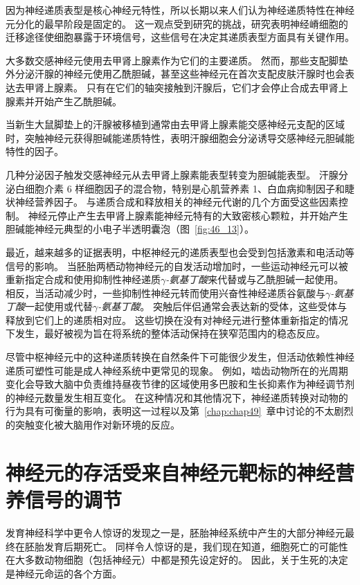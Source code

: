 因为神经递质表型是核心神经元特性，所以长期以来人们认为神经递质特性在神经元分化的最早阶段是固定的。
这一观点受到研究的挑战，研究表明神经嵴细胞的迁移途径使细胞暴露于环境信号，这些信号在决定其递质表型方面具有关键作用。


大多数交感神经元使用去甲肾上腺素作为它们的主要递质。
然而，那些支配脚垫外分泌汗腺的神经元使用乙酰胆碱，甚至这些神经元在首次支配皮肤汗腺时也会表达去甲肾上腺素。
只有在它们的轴突接触到汗腺后，它们才会停止合成去甲肾上腺素并开始产生乙酰胆碱。


当新生大鼠脚垫上的汗腺被移植到通常由去甲肾上腺素能交感神经元支配的区域时，突触神经元获得胆碱能递质特性，表明汗腺细胞会分泌诱导交感神经元胆碱能特性的因子。


几种分泌因子触发交感神经元从去甲肾上腺素能表型转变为胆碱能表型。
汗腺分泌白细胞介素 6 样细胞因子的混合物，特别是心肌营养素 1、白血病抑制因子和睫状神经营养因子。
与递质合成和释放相关的神经元代谢的几个方面受这些因素控制。
神经元停止产生去甲肾上腺素能神经元特有的大致密核心颗粒，并开始产生胆碱能神经元典型的小电子半透明囊泡（图~\ref{fig:46_13}）。


最近，越来越多的证据表明，中枢神经元的递质表型也会受到包括激素和电活动等信号的影响。
当胚胎两栖动物神经元的自发活动增加时，一些运动神经元可以被重新指定合成和使用抑制性神经递质\textit{$\gamma$-氨基丁酸}来代替或与乙酰胆碱一起使用。
相反，当活动减少时，一些抑制性神经元转而使用兴奋性神经递质谷氨酸与\textit{$\gamma$-氨基丁酸}一起使用或代替\textit{$\gamma$-氨基丁酸}。
突触后伴侣通常会表达新的受体，这些受体与释放到它们上的递质相对应。
这些切换在没有对神经元进行整体重新指定的情况下发生，最好被视为旨在将系统的整体活动保持在狭窄范围内的稳态反应。


尽管中枢神经元中的这种递质转换在自然条件下可能很少发生，但活动依赖性神经递质可塑性可能是成人神经系统中更常见的现象。
例如，啮齿动物所在的光周期变化会导致大脑中负责维持昼夜节律的区域使用多巴胺和生长抑素作为神经调节剂的神经元数量发生相互变化。
在这种情况和其他情况下，神经递质转换对动物的行为具有可衡量的影响，表明这一过程以及第~\ref{chap:chap49}~章中讨论的不太剧烈的突触变化被大脑用作对新环境的反应。



\section{神经元的存活受来自神经元靶标的神经营养信号的调节}

发育神经科学中更令人惊讶的发现之一是，胚胎神经系统中产生的大部分神经元最终在胚胎发育后期死亡。
同样令人惊讶的是，我们现在知道，细胞死亡的可能性在大多数动物细胞（包括神经元）中都是预先设定好的。
因此，关于生死的决定是神经元命运的各个方面。



